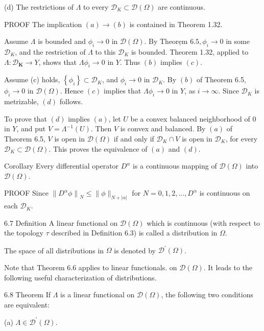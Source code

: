 \documentclass[10pt]{article}
\begin{document}
(d) The restrictions of $\Lambda$ to every $\mathscr{D}_{K} \subset \mathscr{D}(\Omega)$ are continuous.

PROOF The implication $(a) \rightarrow(b)$ is contained in Theorem 1.32.

Assume $\Lambda$ is bounded and $\phi_{i} \rightarrow 0$ in $\mathscr{\mathscr { D }}(\Omega)$. By Theorẹm $6.5, \phi_{i} \rightarrow 0$ in some $\mathscr{D}_{K}$, and the restriction of $\Lambda$ to this $\mathscr{D}_{K}$ is bounded. Theorem 1.32, applied to $\Lambda: \mathscr{D}_{\mathbf{K}} \rightarrow Y$, shows that $\Lambda \phi_{i} \rightarrow 0$ in $Y$. Thus $(b)$ implies $(c)$.

Assume (c) holds, $\left\{\phi_{i}\right\} \subset \mathscr{D}_{K}$, and $\phi_{i} \rightarrow 0$ in $\mathscr{D}_{K}$. By $(b)$ of Theorem 6.5, $\phi_{i} \rightarrow 0$ in $\mathscr{D}(\Omega)$. Hence $(c)$ implies that $\Lambda \phi_{i} \rightarrow 0$ in $Y$, as $i \rightarrow \infty$. Since $\mathscr{D}_{K}$ is metrizable, $(d)$ follows.

To prove that $(d)$ implies $(a)$, let $U$ be a convex balanced neighborhood of 0 in $Y$, and put $V=\Lambda^{-1}(U)$. Then $V$ is convex and balanced. By $(a)$ of Theorem 6.5, $V$ is open in $\mathscr{D}(\Omega)$ if and only if $\mathscr{D}_{K} \cap V$ is open in $\mathscr{D}_{K}$, for every $\mathscr{D}_{K} \subset \mathscr{D}(\Omega)$. This proves the equivalence of $(a)$ and $(d)$.

Corollary Every differential operator $D^{\alpha}$ is a continuous mapping of $\mathscr{D}(\Omega)$ into $\mathscr{D}(\Omega)$.

PROOF Since $\left\|D^{\alpha} \phi\right\|_{N} \leq\|\phi\|_{N+|\alpha|}$ for $N=0,1,2, \ldots, D^{\alpha}$ is continuous on each $\mathscr{D}_{K}$.

6.7 Definition A linear functional on $\mathscr{D}(\Omega)$ which is continuous (with respect to the topology $\tau$ described in Definition 6.3) is called a distribution in $\Omega$.

The space of all distributions in $\Omega$ is denoted by $\mathscr{D}^{\prime}(\Omega)$.

Note that Theorem 6.6 applies to linear functionals. on $\mathscr{D}(\Omega)$. It leads to the following useful characterization of distributions.

6.8 Theorem If $\Lambda$ is a linear functional on $\mathscr{D}(\Omega)$, the following two conditions are equivalent:

(a) $\Lambda \in \mathscr{D}^{\prime}(\Omega)$.
\end{document}
